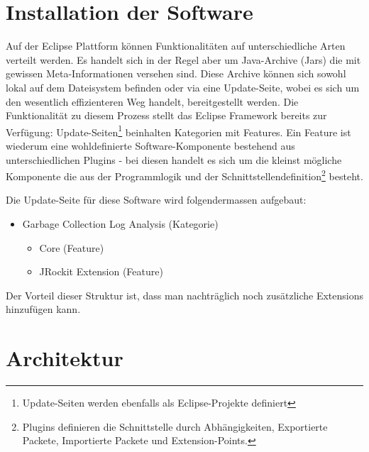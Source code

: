 \section{Installation der Software}\label{installation}
Auf der Eclipse Plattform können Funktionalitäten auf unterschiedliche Arten verteilt werden. Es handelt sich in der Regel aber um Java-Archive (Jars) die mit gewissen Meta-Informationen versehen sind. Diese Archive können sich sowohl lokal auf dem Dateisystem befinden oder via eine Update-Seite, wobei es sich um den wesentlich effizienteren Weg handelt, bereitgestellt werden. Die Funktionalität zu diesem Prozess stellt das Eclipse Framework bereits zur Verfügung: Update-Seiten\footnote{Update-Seiten werden ebenfalls als Eclipse-Projekte definiert} beinhalten Kategorien mit Features. Ein Feature ist wiederum eine wohldefinierte Software-Komponente bestehend aus unterschiedlichen Plugins - bei diesen handelt es sich um die kleinst mögliche Komponente die aus der Programmlogik und der Schnittstellendefinition\footnote{Plugins definieren die Schnittstelle durch Abhängigkeiten, Exportierte Packete, Importierte Packete und Extension-Points.} besteht.

Die Update-Seite für diese Software wird folgendermassen aufgebaut:
\begin{itemize}
	\item Garbage Collection Log Analysis (Kategorie)
		\begin{itemize}
			\item Core (Feature)
			\item JRockit Extension (Feature)
		\end{itemize}
\end{itemize}
Der Vorteil dieser Struktur ist, dass man nachträglich noch zusätzliche Extensions hinzufügen kann.


\section{Architektur}
